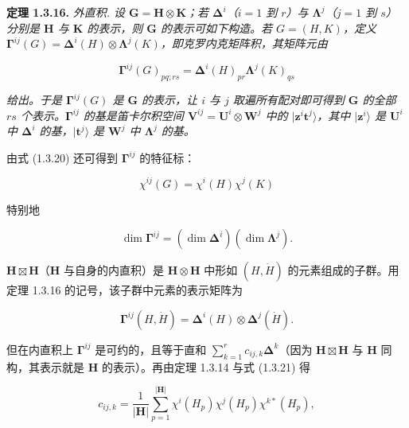 \textbf{定理 1.3.16.} \textit{外直积. 设 $\mathbf{G} = \mathbf{H} \otimes \mathbf{K}$；若 $\boldsymbol{\Delta}^{i}$（$i = 1$ 到 $r$）与 $\boldsymbol{\Lambda}^{j}$（$j = 1$ 到 $s$）分别是 $\mathbf{H}$ 与 $\mathbf{K}$ 的表示，则 $\mathbf{G}$ 的表示可如下构造。若 $G = (H, K)$，定义 $\mathbf{\Gamma}^{ij}(G) = \boldsymbol{\Delta}^{i}(H) \otimes \boldsymbol{\Lambda}^{j}(K)$，即克罗内克矩阵积，其矩阵元由}

\begin{equation*}
\mathbf{\Gamma}^{ij}(G)_{pq;rs} = \boldsymbol{\Delta}^{i}(H)_{pr}\boldsymbol{\Lambda}^{j}(K)_{qs}
\tag{1.3.20}
\end{equation*}

\textit{给出。于是 $\mathbf{\Gamma}^{ij}(G)$ 是 $\mathbf{G}$ 的表示，让 $i$ 与 $j$ 取遍所有配对即可得到 $\mathbf{G}$ 的全部 $rs$ 个表示。$\mathbf{\Gamma}^{ij}$ 的基是笛卡尔积空间 $\mathbf{V}^{ij} = \mathbf{U}^{i} \otimes \mathbf{W}^{j}$ 中的 $|\mathbf{z}^{i}\mathbf{t}^{j}\rangle$，其中 $|\mathbf{z}^{i}\rangle$ 是 $\mathbf{U}^{i}$ 中 $\boldsymbol{\Delta}^{i}$ 的基，$|\mathbf{t}^{j}\rangle$ 是 $\mathbf{W}^{j}$ 中 $\boldsymbol{\Lambda}^{j}$ 的基。}

由式 (1.3.20) 还可得到 $\mathbf{\Gamma}^{ij}$ 的特征标：

\begin{equation*}
\chi^{ij}(G) = \chi^{i}(H)\chi^{j}(K)
\tag{1.3.21}
\end{equation*}

特别地

\begin{equation*}
\dim \mathbf{\Gamma}^{ij} = (\dim \boldsymbol{\Delta}^{i})(\dim \boldsymbol{\Lambda}^{j}).
\tag{1.3.22}
\end{equation*}

$\mathbf{H} \boxtimes \mathbf{H}$（$\mathbf{H}$ 与自身的内直积）是 $\mathbf{H} \otimes \mathbf{H}$ 中形如 $(H, \dot{H})$ 的元素组成的子群。用定理 1.3.16 的记号，该子群中元素的表示矩阵为

\begin{equation*}
\mathbf{\Gamma}^{ij}(H, \dot{H}) = \boldsymbol{\Delta}^{i}(H) \otimes \boldsymbol{\Delta}^{j}(\dot{H}).
\tag{1.3.23}
\end{equation*}

但在内直积上 $\mathbf{\Gamma}^{ij}$ 是可约的，且等于直和 $\sum_{k=1}^{r} c_{ij,k}\boldsymbol{\Delta}^{k}$（因为 $\mathbf{H} \boxtimes \mathbf{H}$ 与 $\mathbf{H}$ 同构，其表示就是 $\mathbf{H}$ 的表示）。再由定理 1.3.14 与式 (1.3.21) 得

\begin{equation*}
c_{ij,k} = \frac{1}{|\mathbf{H}|}\sum_{p=1}^{|\mathbf{H}|} \chi^{i}(H_{p})\chi^{j}(H_{p})\chi^{k*}(H_{p}),
\tag{1.3.24}
\end{equation*}


